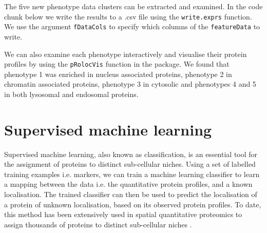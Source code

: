\pagebreak

The five new phenotype data clusters can be
extracted and examined.  In the code chunk below we write the results
to a .csv file using the \texttt{write.exprs} function. We use the
argument \texttt{fDataCols} to specify which columns of the
\texttt{featureData} to write.

\pagebreak

\begin{knitrout}
\color{fgcolor}\begin{kframe}
\begin{alltt}
\hlopt{$} \hlkwb{<-} \hlstd{(}\hlopt{$}
  \hlstd{=} \hlstd{,}  \hlstd{=} \hlstd{,}  \hlstd{=} \hlstd{)}
\end{alltt}
\end{kframe}
\end{knitrout}


We can also examine each phenotype interactively and visualise
their protein profiles by using the \texttt{pRolocVis} function in the
 package. We found that phenotype 1 was
enriched in nucleus associated proteins, phenotype 2 in chromatin
associated proteins, phenotype 3 in cytosolic and phenotypes 4 and 5
in both lysosomal and endosomal proteins.

\begin{knitrout}
\color{fgcolor}\begin{kframe}
\begin{alltt}
  \hlstd{=} \hlstd{)}
\end{alltt}
\end{kframe}
\end{knitrout}

\section*{Supervised machine learning}

Supervised machine learning, also known as classification, is an
essential tool for the assignment of proteins to distinct sub-cellular
niches. Using a set of labelled training examples i.e. markers, we can
train a machine learning classifier to learn a mapping between the
data i.e. the quantitative protein profiles, and a known localisation.
The trained classifier can then be used to predict the localisation of
a protein of unknown localisation, based on its observed protein
profiles. To date, this method has been extensively used in spatial
quantitative proteomics to assign thousands of proteins to distinct
sub-cellular niches
\cite{hyper,Groen:2014,Trotter:2010,Hall:2009,Dunkley:2006,Tan:2009}.

